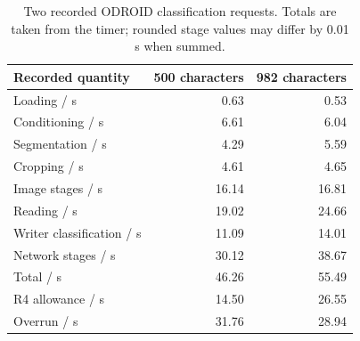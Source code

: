\begin{table}[!htbp]\centering\small
\begin{tabular}{lrr}\toprule
\textbf{Recorded quantity} & \textbf{500 characters} & \textbf{982 characters}\\\midrule
Loading / s & 0.63 & 0.53\\
Conditioning / s & 6.61 & 6.04\\
Segmentation / s & 4.29 & 5.59\\
Cropping / s & 4.61 & 4.65\\
Image stages / s & 16.14 & 16.81\\
Reading / s & 19.02 & 24.66\\
Writer classification / s & 11.09 & 14.01\\
Network stages / s & 30.12 & 38.67\\
Total / s & 46.26 & 55.49\\
R4 allowance / s & 14.50 & 26.55\\
Overrun / s & 31.76 & 28.94\\
\bottomrule\end{tabular}
\caption{Two recorded ODROID classification requests. Totals are taken from the timer; rounded stage values may differ by 0.01 s when summed.}\label{tab:res-r4-times}
\end{table}

